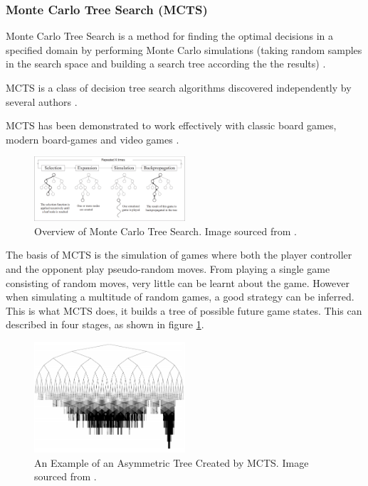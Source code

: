 \documentclass[journal]{IEEEtran}
\begin{document}
		\subsubsection{Monte Carlo Tree Search (MCTS) }\label{sssec:MCTS}

		Monte Carlo Tree Search is a method for finding the optimal decisions in a specified domain by performing Monte Carlo simulations (taking random samples in the search space and building a search tree according the the results) \cite{browne2012survey}. 

		MCTS is a class of decision tree search algorithms discovered independently by several authors \cite{coulom2006efficient, kocsis2006bandit, chaslot2006monte}.
		
		MCTS has been demonstrated to work effectively with classic board games, modern board-games and video games \cite{chaslot2008monte, pepels2014real}.

		\begin{figure}[h]
		    \centering
		    \includegraphics[width=0.5\textwidth]{MCTSProcess}
		    \caption{Overview of Monte Carlo Tree Search. Image sourced from \cite{chaslot2008monte}. }
		    \label{fig:MCTS1}
		\end{figure}
		

		The basis of MCTS is the simulation of games where both the player controller and the opponent play pseudo-random moves. From playing a single game consisting of random moves, very little can be learnt about the game. However when simulating a multitude of random games, a good strategy can be inferred. This is what MCTS does, it builds a tree of possible future game states. This can described in four stages, as shown in figure \ref{fig:MCTS1}.
				\begin{figure}[h]
		    \centering
		    \includegraphics[width=0.5\textwidth]{MCTSasymmetry}
		    \caption{An Example of an Asymmetric Tree Created by MCTS. Image sourced from \cite{coquelin2007bandit}. }
		    \label{fig:MCTS2}
		\end{figure}
\end{document}
